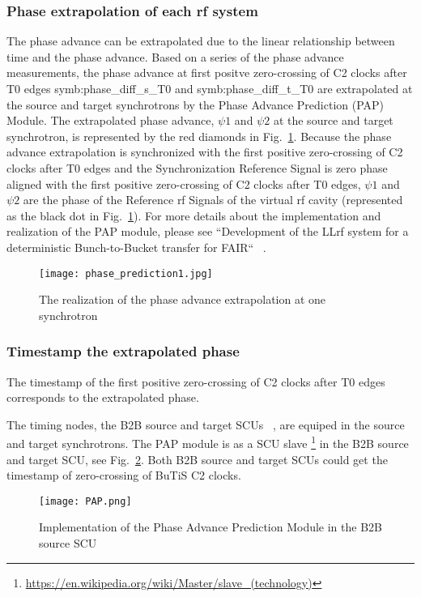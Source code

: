 \subsubsection{Phase extrapolation of each rf system}
The phase advance can be extrapolated due to the linear relationship between time and the phase advance. Based on a series of the phase advance measurements, the phase advance at first positve zero-crossing of C2 clocks after T0 edges \gls{symb:phase_diff_s_T0} and \gls{symb:phase_diff_t_T0} are extrapolated at the source and target synchrotrons by the Phase Advance Prediction (\gls{PAP}) Module. The extrapolated phase advance, $\psi1$ and $\psi2$ at the source and target synchrotron, is represented by the red diamonds in Fig.~\ref{phase_prediction1}. Because the phase advance extrapolation is synchronized with the first positive zero-crossing of C2 clocks after T0 edges and the Synchronization Reference Signal is zero phase aligned with the first positive zero-crossing of C2 clocks after T0 edges, $\psi1$ and $\psi2$ are the phase of the Reference rf Signals of the virtual rf cavity (represented as the black dot in Fig.~\ref{phase_prediction1}). For more details about the implementation and realization of the PAP module, please see ``Development of the LLrf system for a deterministic Bunch-to-Bucket transfer for FAIR`` ~\cite{ferrand_development_????}.   
\begin{figure}[H]
   \centering   
   \texttt{[image: phase\_prediction1.jpg]}
   \caption{The realization of the phase advance extrapolation at one synchrotron}
   \label{phase_prediction1}
\end{figure}
\subsubsection{Timestamp the extrapolated phase}
The timestamp of the first positive zero-crossing of C2 clocks after T0 edges corresponds to the extrapolated phase. 

The timing nodes, the B2B source and target SCUs ~\cite{beck_new_2012, thieme_scu_2013}, are equiped in the source and target synchrotrons. The PAP module is as a SCU slave \footnote{\url{https://en.wikipedia.org/wiki/Master/slave_(technology)}} in the B2B source and target SCU, see Fig.~\ref{PAP}. Both B2B source and target SCUs could get the timestamp of zero-crossing of \gls{BuTiS} C2 clocks. 
 \begin{figure}[!htb]
   \centering   
   \texttt{[image: PAP.png]}
   \caption{Implementation of the Phase Advance Prediction Module in the B2B source SCU}
   \label{PAP}
\end{figure}

